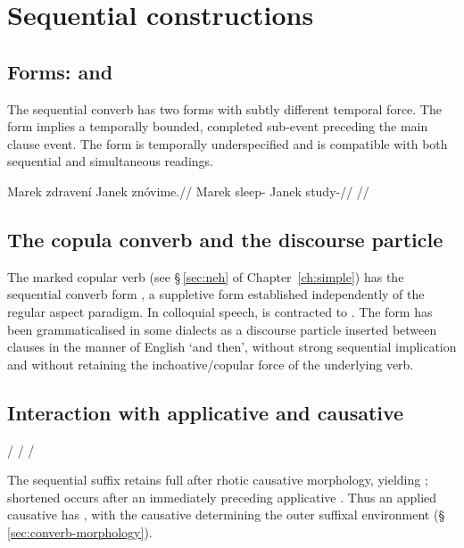 \section{Sequential constructions}\label{sec:sequential}

\subsection{Forms:  and }

The sequential converb has two forms with subtly different temporal force. The
 form implies a temporally bounded, completed sub-event preceding the
main clause event. The  form is temporally underspecified and is
compatible with both sequential and simultaneous readings.

\pex
\a
\begingl
\gla Marek zdravení Janek znóvime.//
\glb Marek sleep-\Seq{} Janek study-\Prog{}//
\glft {} //
\endgl
\xe

\subsection{The copula converb and the discourse particle }\label{sec:seq-copula}

The marked copular verb  (see §\,\ref{sec:neh} of
Chapter~\ref{ch:simple}) has the sequential converb form , a
suppletive form established independently of the regular aspect paradigm. In
colloquial speech,  is contracted to . The form  has
been grammaticalised in some dialects as a discourse particle inserted between
clauses in the manner of English `and then', without strong sequential
implication and without retaining the inchoative/copular force of the underlying
verb.

\subsection{Interaction with applicative and causative}

\pex
\a {} /  
\a {} /  
\a {} /  
\xe

The sequential suffix retains full  after rhotic causative
morphology, yielding ; shortened  occurs
after an immediately preceding applicative . Thus an applied
causative has , with the causative determining the
outer suffixal environment (§\,\ref{sec:converb-morphology}).

